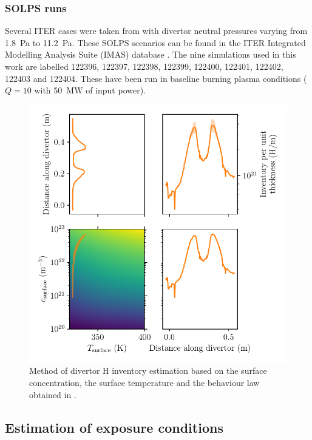 \subsubsection{SOLPS runs}
Several ITER cases were taken from  with divertor neutral pressures varying from \SI{1.8}{Pa} to \SI{11.2}{Pa}.
These SOLPS  scenarios can be found in the ITER Integrated Modelling Analysis Suite (IMAS) database .
The nine simulations used in this work are labelled 122396, 122397, 122398, 122399, 122400, 122401, 122402, 122403 and 122404.
These have been run in baseline burning plasma conditions ($Q=10$ with \SI{50}{MW} of input power).


\begin{figure}[h!]
    \centering
    \includegraphics[width=\linewidth]{Figures/Chapter4/example.pdf}
    \caption{Method of divertor H inventory estimation based on the surface concentration, the surface temperature and the behaviour law obtained in .}
\end{figure}

\subsection{Estimation of exposure conditions}

